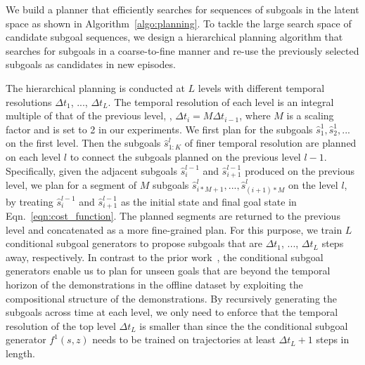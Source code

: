 We build a planner that efficiently searches for sequences of subgoals in the latent space as shown in Algorithm~\ref{algo:planning}. To tackle the large search space of candidate subgoal sequences, we design a hierarchical planning algorithm that searches for subgoals in a coarse-to-fine manner and re-use the previously selected subgoals as candidates in new episodes.

The hierarchical planning is conducted at $L$ levels with different temporal resolutions $\Delta t_1$, ..., $\Delta t_L$. The temporal resolution of each level is an integral multiple of that of the previous level, \ie, $\Delta t_i = M \Delta t_{i - 1}$, where $M$ is a scaling factor and is set to 2 in our experiments. We first plan for the subgoals $\hat{s}_1^1, \hat{s}_2^1, ...$ on the first level. Then the subgoals $\hat{s}_{1:K}^l$ of finer temporal resolution are planned on each level $l$ to connect the subgoals planned on the previous level $l-1$. Specifically, given the adjacent subgoals $\hat{s}_i^{l-1}$ and $\hat{s}_{i+1}^{l-1}$ produced on the previous level, we plan for a segment of  $M$ subgoals $\hat{s}_{i * M + 1}^{l}, ..., \hat{s}_{(i+1) * M}^{l}$ on the level $l$, by treating $\hat{s}_i^{l-1}$ and $\hat{s}_{i+1}^{l-1}$ as the initial state and final goal state in Eqn.~\ref{eqn:cost_function}. The planned segments are returned to the previous level and concatenated as a more fine-grained plan. For this purpose, we train $L$ conditional subgoal generators to propose subgoals that are $\Delta t_1$, ..., $\Delta t_L$ steps away, respectively. In contrast to the prior work~\citep{Pertsch2020LongHorizonVP}, the conditional subgoal generators enable us to plan for unseen goals that are beyond the temporal horizon of the demonstrations in the offline dataset by exploiting the compositional structure of the demonstrations. By recursively generating the subgoals across time at each level, we only need to enforce that the temporal resolution of the top level $\Delta t_L$ is smaller than since the the conditional subgoal generator $f^{1}(s, z)$ needs to be trained on trajectories at least $\Delta t_L + 1$ steps in length. 

